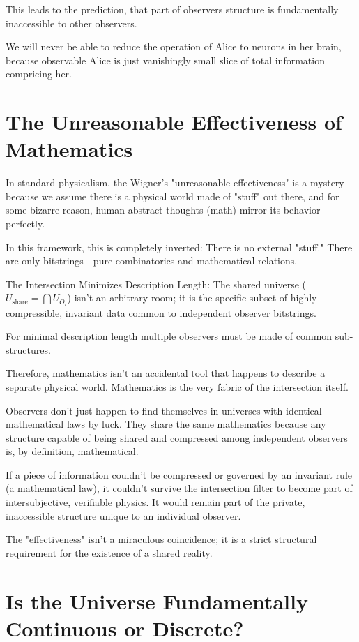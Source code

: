 This leads to the prediction, that part of observers structure is
fundamentally inaccessible to other observers. 

We will never be able to reduce the operation of Alice to
neurons in her brain, because observable Alice is just vanishingly
small slice of total information compricing her. 


\section{The Unreasonable Effectiveness of Mathematics}

In standard physicalism, the Wigner's "unreasonable effectiveness"  \cite{wigner1960} is a mystery because we assume there is a
physical world made of "stuff" out there, and for some bizarre reason,
human abstract thoughts (math) mirror its behavior perfectly.

In this framework, this is completely inverted: There is no external "stuff." There are only bitstrings—pure combinatorics and mathematical relations.

The Intersection Minimizes Description Length: The shared universe ($U_{\text{share}} = \bigcap U_{O_i}$) isn't an arbitrary room; it is the specific subset of highly compressible, invariant data common to independent observer bitstrings.

For minimal description length multiple observers must be made of common sub-structures.

Therefore, mathematics isn't an accidental tool that happens to describe a separate physical world.
Mathematics is the very fabric of the intersection itself.

Observers don't just happen to find themselves in universes with identical mathematical laws by luck.
They share the same mathematics because any structure capable of being shared and compressed among independent observers is,
by definition, mathematical.

If a piece of information couldn't be compressed or governed by an invariant rule (a mathematical law),
it couldn't survive the intersection filter to become part of intersubjective, verifiable physics.
It would remain part of the private, inaccessible structure unique to an individual observer.

The "effectiveness" isn't a miraculous coincidence; it is a strict structural requirement for the existence of a shared reality.


\section{Is the Universe Fundamentally Continuous or Discrete?}

